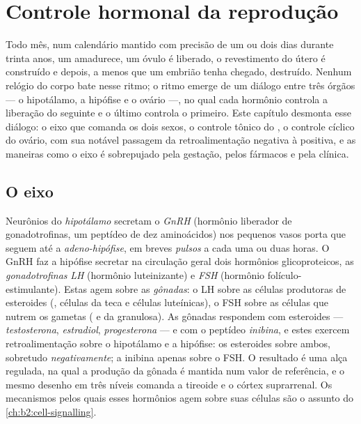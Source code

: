 \chapter{Controle hormonal da reprodução}\label{ch:b2:reproductive-hormones}

Todo mês, num calendário mantido com precisão de um ou dois dias
durante trinta anos, um  amadurece, um óvulo é liberado, o
revestimento do útero é construído e depois, a menos que um embrião
tenha chegado, destruído. Nenhum relógio do corpo bate nesse ritmo; o
ritmo emerge de um diálogo entre três órgãos --- o hipotálamo, a
hipófise e o ovário ---, no qual cada hormônio controla a liberação do
seguinte e o último controla o primeiro. Este capítulo desmonta esse
diálogo: o eixo que comanda os dois sexos, o controle tônico do
, o controle cíclico do ovário, com sua notável passagem da
retroalimentação negativa à positiva, e as maneiras como o eixo é
sobrepujado pela gestação, pelos fármacos e pela clínica.

\section{O eixo}

\begin{definition}\label{def:b2:reproductive-hormones:axis}
Neurônios do \emph{hipotálamo} secretam o \emph{GnRH} (hormônio
liberador de gonadotrofinas, um peptídeo de dez aminoácidos) nos
pequenos vasos porta que seguem até a \emph{adeno-hipófise}, em
breves \emph{pulsos} a cada uma ou duas horas. O GnRH faz a hipófise
secretar na circulação geral dois hormônios glicoproteicos, as
\emph{gonadotrofinas} \emph{LH} (hormônio luteinizante) e \emph{FSH}
(hormônio folículo-estimulante). Estas agem sobre as \emph{gônadas}: o
LH sobre as células produtoras de esteroides (,
células da teca e células luteínicas), o FSH sobre as células que
nutrem os gametas ( e da granulosa). As gônadas
respondem com esteroides --- \emph{testosterona}, \emph{estradiol},
\emph{progesterona} --- e com o peptídeo \emph{inibina}, e estes
exercem retroalimentação sobre o hipotálamo e a hipófise: os
esteroides sobre ambos, sobretudo \emph{negativamente}; a inibina
apenas sobre o FSH. O resultado é uma alça regulada, na qual a
produção da gônada é mantida num valor de referência, e o mesmo
desenho em três níveis comanda a tireoide e o córtex suprarrenal. Os
mecanismos pelos quais esses hormônios agem sobre suas células são o
assunto do \cref{ch:b2:cell-signalling}.
\end{definition}

